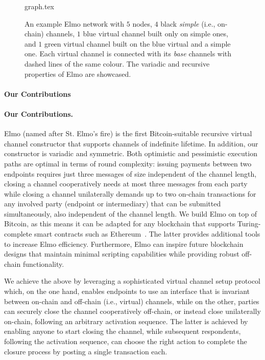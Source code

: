 \begin{figure}[!htbp]
  \centering
  {graph.tex}
  \caption{An example Elmo network with $5$ nodes, $4$ black \emph{simple}
  (i.e., on-chain) channels, $1$ blue virtual channel built only on simple ones,
  and $1$ green virtual channel built on the blue virtual and a simple one. Each
  virtual channel is connected with its \emph{base} channels with dashed lines
  of the same colour. The variadic and recursive properties of Elmo are
  showcased.}
  \label{figure:graph}
\end{figure}

\makeatletter%
%
  {\paragraph{Our Contributions}}%
  {\paragraph{Our Contributions.}}%
\makeatother%
 Elmo (named after St.
Elmo's fire) is the first Bitcoin-suitable
recursive virtual channel constructor that supports channels
of indefinite lifetime. In addition, our constructor is variadic and symmetric. Both optimistic and
pessimistic execution paths are optimal in terms of round complexity: issuing
payments between two endpoints requires just three messages of size
independent of the channel length, closing a channel cooperatively
needs at most three messages from each party while
closing a channel unilaterally demands up to two on-chain transactions for
any involved party (endpoint or intermediary) that can be submitted
simultaneously, also independent of the channel length. We build Elmo on top
of Bitcoin, as this means it can be adapted for any blockchain that
supports Turing-complete smart contracts such as
Ethereum~\cite{wood2014ethereum}. The latter provides additional tools to
increase Elmo efficiency. Furthermore, Elmo can inspire future
blockchain designs that maintain minimal scripting capabilities while
providing robust off-chain functionality.

We achieve the above by leveraging a sophisticated virtual channel setup
protocol which, on the one hand, enables endpoints to use an interface that is
invariant between on-chain and off-chain (i.e., virtual) channels,
while on the other, parties can securely close the channel cooperatively
off-chain, or instead close unilaterally on-chain, following an arbitrary
activation sequence. The latter is achieved by enabling anyone to
start closing the channel, while subsequent respondents, following the activation sequence, can choose the right action to complete the closure process by posting a single transaction each.


